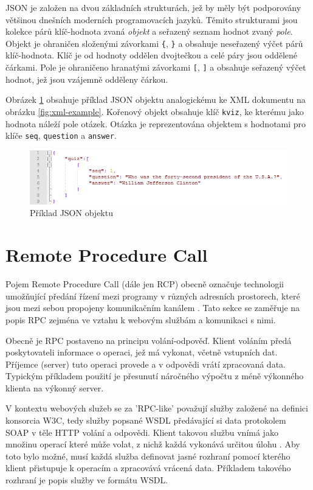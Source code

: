 \documentclass[czech,DP]{thesiskiv}
\begin{document}
JSON je založen na dvou základních strukturách, jež by měly být podporovány většinou dnešních moderních programovacích jazyků. Těmito strukturami jsou kolekce párů klíč-hodnota zvaná \textit{objekt} a seřazený seznam hodnot zvaný \textit{pole}. Objekt je ohraničen složenými závorkami \verb|{|, \verb|}| a obsahuje neseřazený výčet párů klíč-hodnota. Klíč je od hodnoty oddělen dvojtečkou a celé páry jsou oddělené čárkami. Pole je ohraničeno hranatými závorkami \verb|[|, \verb|]| a obsahuje seřazený výčet hodnot, jež jsou vzájemně odděleny čárkou.

Obrázek \ref{fig:json-examle} obsahuje příklad JSON objektu analogickému ke XML dokumentu na obrázku \ref{fig:xml-example}. Kořenový objekt obsahuje klíč \verb|kviz|, ke kterému jako hodnota náleží pole otázek. Otázka je reprezentována objektem s hodnotami pro klíče \verb|seq|, \verb|question| a \verb|answer|.

\begin{figure}[h]
	\centering
	\includegraphics[width=\linewidth]{json-example.png}
	\caption{Příklad JSON objektu}
	\label{fig:json-examle}
\end{figure}

\section{Remote Procedure Call}
\label{sec:rpc-ws}

Pojem Remote Procedure Call (dále jen RCP) obecně označuje technologii umožňující předání řízení mezi programy v různých adresních prostorech, které jsou mezi sebou propojeny komunikačním kanálem \cite{rpcThesis}. Tato sekce se zaměřuje na popis RPC zejména ve vztahu k webovým službám a komunikaci s nimi.

Obecně je RPC postaveno na principu volání-odpověď. Klient voláním předá poskytovateli informace o operaci, jež má vykonat, včetně vstupních dat. Příjemce (server) tuto operaci provede a v odpovědi vrátí zpracovaná data. Typickým příkladem použití je přesunutí náročného výpočtu z méně výkonného klienta na výkonný server.

V kontextu webových služeb se za 'RPC-like' považují služby založené na definici konsorcia W3C, tedy služby popsané WSDL předávající si data protokolem SOAP v těle HTTP volání a odpovědi. Klient takovou službu vnímá jako množinu operací které může volat, z nichž každá vykonává určitou úlohu \cite{rpcVsRest}. Aby toto bylo možné, musí každá služba definovat jasné rozhraní pomocí kterého klient přistupuje k operacím a zpracovává vrácená data. Příkladem takového rozhraní je popis služby ve formátu WSDL. 
\end{document}
